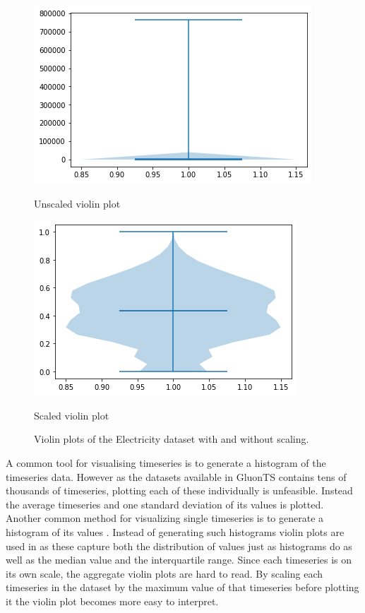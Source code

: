 \begin{figure}[htb]
  \centering
  \includegraphics[width=\linewidth]{./img/electricity_violin_unscaled.png}
  \caption{Unscaled violin plot}

  \label{fig:electricity_violin_unscaled}
  \endminipage\hfill
  \includegraphics[width=\linewidth]{./img/electricity_violin.png}
  \caption{Scaled violin plot}
  \label{fig:electricity_violin_scaled}
  \endminipage\hfill
  \caption{Violin plots of the Electricity dataset with and without scaling.}
\end{figure}

A common tool for visualising timeseries is to generate a histogram of the timeseries data. However as the datasets available in GluonTS contains tens of thousands of timeseries, plotting each of these individually is unfeasible. Instead the average timeseries and one standard deviation of its values is plotted. Another common method for visualizing single timeseries is to generate a histogram of its values \cite{hyndman_forecasting_3rd}. Instead of generating such histograms violin plots are used in as these capture both the distribution of values just as histograms do as well as the median value and the interquartile range. Since each timeseries is on its own scale, the aggregate violin plots are hard to read. By scaling each timeseries in the dataset by the maximum value of that timeseries before plotting it the violin plot becomes more easy to interpret.

